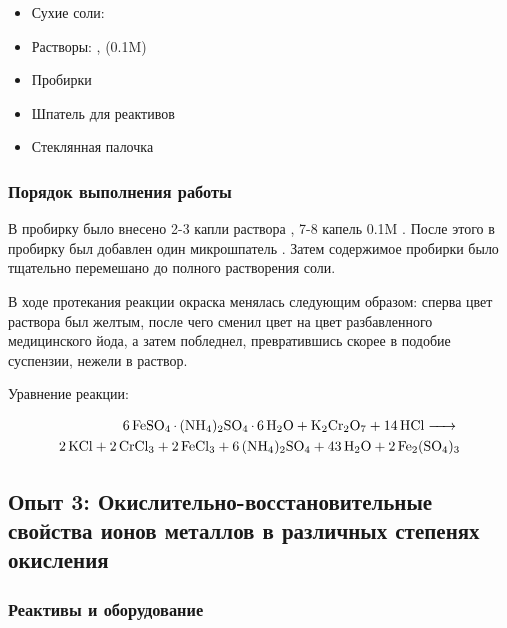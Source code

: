 \documentclass[a4paper, 12pt]{article}
\begin{document}
\begin{itemize}
	\item Сухие соли: 
	
	\item Растворы: ,  (0.1M)
	
	\item Пробирки
	\item Шпатель для реактивов
	\item Стеклянная палочка
\end{itemize}

\subsubsection{Порядок выполнения работы}

В пробирку было внесено 2-3 капли раствора , 7-8 капель 0.1M . После этого в пробирку был добавлен один микрошпатель . Затем содержимое пробирки было тщательно перемешано до полного растворения соли.

В ходе протекания реакции окраска менялась следующим образом: сперва цвет раствора был желтым, после чего сменил цвет на цвет разбавленного медицинского йода, а затем побледнел, превратившись скорее в подобие суспензии, нежели в раствор.

Уравнение реакции:

\begin{align*}
	\ce{6FeSO4 * (NH4)2SO4 * 6H2O + K2Cr2O7 + 14 HCl -> }\\
	\ce{2 KCl + 2CrCl3 + 2 FeCl3 + 6(NH4)2SO4 + 43H2O + 2Fe2(SO4)3}
\end{align*}



%

\subsection{Опыт 3: Окислительно-восстановительные свойства ионов металлов в различных степенях окисления}

\subsubsection{Реактивы и оборудование}
\end{document}
